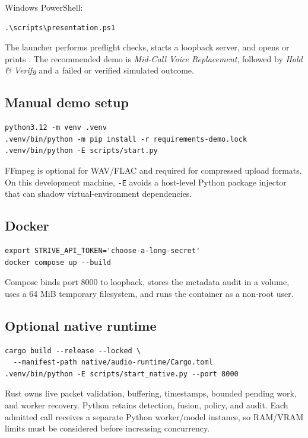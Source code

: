 \documentclass[10pt,a4paper]{article}
\newcommand{\code}[1]{\texttt{\small #1}}
\begin{document}
Windows PowerShell:
\begin{verbatim}
.\scripts\presentation.ps1
\end{verbatim}

The launcher performs preflight checks, starts a loopback server, and opens or prints . The recommended demo is \emph{Mid-Call Voice Replacement}, followed by \emph{Hold \& Verify} and a failed or verified simulated outcome.

\subsection{Manual demo setup}

\begin{verbatim}
python3.12 -m venv .venv
.venv/bin/python -m pip install -r requirements-demo.lock
.venv/bin/python -E scripts/start.py
\end{verbatim}

FFmpeg is optional for WAV/FLAC and required for compressed upload formats. On this development machine, \code{-E} avoids a host-level Python package injector that can shadow virtual-environment dependencies.

\subsection{Docker}

\begin{verbatim}
export STRIVE_API_TOKEN='choose-a-long-secret'
docker compose up --build
\end{verbatim}

Compose binds port 8000 to loopback, stores the metadata audit in a volume, uses a 64 MiB temporary filesystem, and runs the container as a non-root user.

\subsection{Optional native runtime}

\begin{verbatim}
cargo build --release --locked \
  --manifest-path native/audio-runtime/Cargo.toml
.venv/bin/python -E scripts/start_native.py --port 8000
\end{verbatim}

Rust owns live packet validation, buffering, timestamps, bounded pending work, and worker recovery. Python retains detection, fusion, policy, and audit. Each admitted call receives a separate Python worker/model instance, so RAM/VRAM limits must be considered before increasing concurrency.
\end{document}
